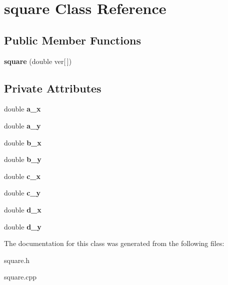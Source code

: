\hypertarget{classsquare}{}\section{square Class Reference}
\label{classsquare}
\subsection*{Public Member Functions}
\begin{DoxyCompactItemize}
\item 
\mbox{\label{classsquare_a15254b64f3895564186ed88f63cf6304}} 
{\bfseries square} (double ver\mbox{[}$\,$\mbox{]})
\end{DoxyCompactItemize}
\subsection*{Private Attributes}
\begin{DoxyCompactItemize}
\item 
\mbox{\label{classsquare_a11fd76f933347c67bb461682b32b351e}} 
double {\bfseries a\+\_\+x}
\item 
\mbox{\label{classsquare_a84b4b43fe1b571f9608bc326935cb1f5}} 
double {\bfseries a\+\_\+y}
\item 
\mbox{\label{classsquare_ac1b3e9c660a0cfcd033c1680e8050109}} 
double {\bfseries b\+\_\+x}
\item 
\mbox{\label{classsquare_a7462258503d8f0989db7005fa21f20ed}} 
double {\bfseries b\+\_\+y}
\item 
\mbox{\label{classsquare_a3e75f76ddf37a87cbf85108b5404d9ec}} 
double {\bfseries c\+\_\+x}
\item 
\mbox{\label{classsquare_a2a8631e98f5ead46e78cb22b7c2b6d35}} 
double {\bfseries c\+\_\+y}
\item 
\mbox{\label{classsquare_ae759be39ebe1642d767fa2e0307e7ac6}} 
double {\bfseries d\+\_\+x}
\item 
\mbox{\label{classsquare_ae28f6ec4408a55d969fdbba126913145}} 
double {\bfseries d\+\_\+y}
\end{DoxyCompactItemize}


The documentation for this class was generated from the following files\+:\begin{DoxyCompactItemize}
\item 
square.\+h\item 
square.\+cpp\end{DoxyCompactItemize}
